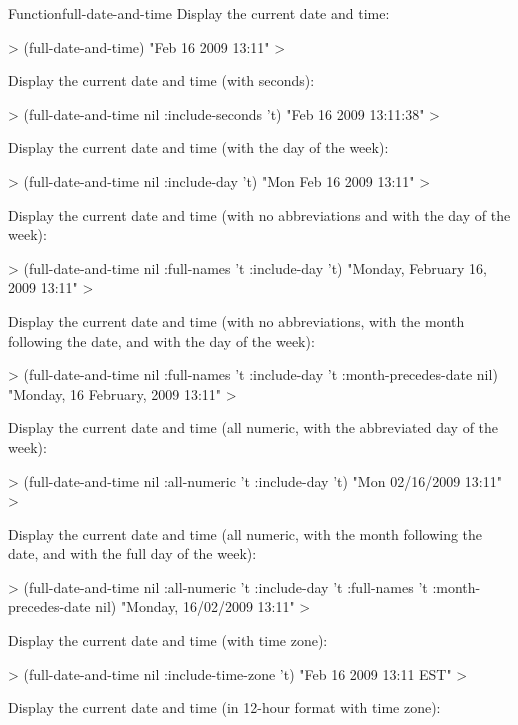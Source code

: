 \documentclass[10pt,twoside,english,pdftex]{article}
\begin{document}
\begin{functiondoc}{Function}{full-date-and-time}
\fnexamples
Display the current date and time: 
%
\W\supp
\begin{example}
  > (full-date-and-time)
  "Feb 16 2009 13:11"
  >
\end{example}
%
Display the current date and time (with seconds):
%
\W\supp\notpretop
\begin{example}
  > (full-date-and-time nil :include-seconds 't)
  "Feb 16 2009 13:11:38"
  >
\end{example}
%
Display the current date and time (with the day of the week):
%
\W\supp\notpretop
\begin{example}
  > (full-date-and-time nil :include-day 't)
  "Mon Feb 16 2009 13:11"
  >
\end{example}
%
Display the current date and time (with no abbreviations and with the day of
the week):
%
\W\supp\notpretop
\begin{example}
  > (full-date-and-time nil :full-names 't :include-day 't)
  "Monday, February 16, 2009 13:11"
  >
\end{example}
%
Display the current date and time (with no abbreviations, with the month
following the date, and with the day of the week):
%
\W\supp\notpretop
\begin{example}
  > (full-date-and-time nil :full-names 't :include-day 't
                            :month-precedes-date nil)
  "Monday, 16 February, 2009 13:11"
  >
\end{example}
%
Display the current date and time (all numeric, with the abbreviated day of
the week):
%
\W\supp\notpretop
\begin{example}
  > (full-date-and-time nil :all-numeric 't :include-day 't)
  "Mon 02/16/2009 13:11"
  >
\end{example}
%
Display the current date and time (all numeric, with the month following the
date, and with the full day of the week):
%
\W\supp\notpretop
\begin{example}
  > (full-date-and-time nil :all-numeric 't :include-day 't 
                        :full-names 't :month-precedes-date nil)
  "Monday, 16/02/2009 13:11"
  >
\end{example}
%
Display the current date and time (with time zone):
%
\W\supp\notpretop
\begin{example}
  > (full-date-and-time nil :include-time-zone 't)
  "Feb 16 2009 13:11 EST"
  >
\end{example}
%
Display the current date and time (in 12-hour format with time zone):
%
\W\supp\notpretop
\begin{example}

\end{example}
\end{functiondoc}
\end{document}
